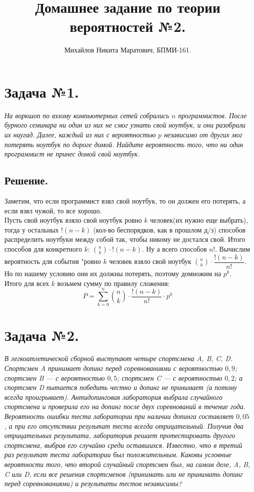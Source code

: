 \documentclass[a4paper, 12pt]{article}
\title{
	Домашнее задание по теории вероятностей №2.
}
\author{Михайлов Никита Маратович, БПМИ-161.
}
\date{}
\begin{document}
\maketitle
\begin{spacing}{1}

\section{Задача №1.}
\textit{На воркшоп по взлому компьютерных сетей собрались $n$ программистов. После бурного семинара ни один из них не смог узнать свой ноутбук, и они разобрали их наугад. Далее, каждый из них с вероятностью $p$ независимо от других мог потерять ноутбук по дороге домой. Найдите вероятность того, что ни один программист не принес домой свой ноутбук.}
\subsection{Решение.} Заметим, что если программист взял свой ноутбук, то он должен его потерять, а если взял чужой, то все хорошо.\\
Пусть свой ноутбук взяло свой ноутбук ровно $k$ человек(их нужно еще выбрать), тогда у остальных $!(n-k)$ (кол-во беспорядков, как в прошлом д/з) способов распределить ноутбуки между собой так, чтобы никому не достался свой. Итого способов для конкретного $k$: $\binom{n}{k}\cdot !(n-k)$. Ну а всего способов $n!$. Вычислим вероятность для события "ровно $k$ человек взяло свой ноутбук $\binom{n}{k}\cdot \dfrac{!(n-k)}{n!}$. Но по нашему условию они их должны потерять, поэтому домножим на $p^k$. Итого для всех $k$ возьмем сумму по правилу сложения: 
$$
P = \sum\limits_{k=0}^n\binom{n}{k}\cdot \dfrac{!(n-k)}{n!}\cdot p^k
$$
\section{Задача №2.}
\textit{В легкоатлетической сборной выступают четыре спортсмена A, B, C, D. Спортсмен A принимает допинг перед соревнованиями с вероятностью $0,9$; спортсмен B — с вероятностью $0,5$; спортсмен C — с вероятностью $0,2$; а спортсмен D пытается победить честно и допинг не принимает (а потому всегда проигрывает). Антидопинговая	лаборатория выбрала случайного спортсмена и проверила его на допинг после двух	соревнований в течение года. Вероятность ошибки теста лаборатории при наличии допинга составляет $0,05$, а при его отсутствии результат теста всегда отрицательный. Получив два отрицательных результата, лаборатория решает протестировать	другого спортсмена, выбрав его случайно среди оставшихся. Известно, что в третий раз результат теста лаборатории был положительным. Каковы условные вероятности	того, что второй случайный спортсмен был, на самом деле, A, B, C или D, если все решения спортсменов (принимать или не принимать допинг перед соревнованиями) и результаты тестов независимы?}

\end{spacing}
\end{document}
